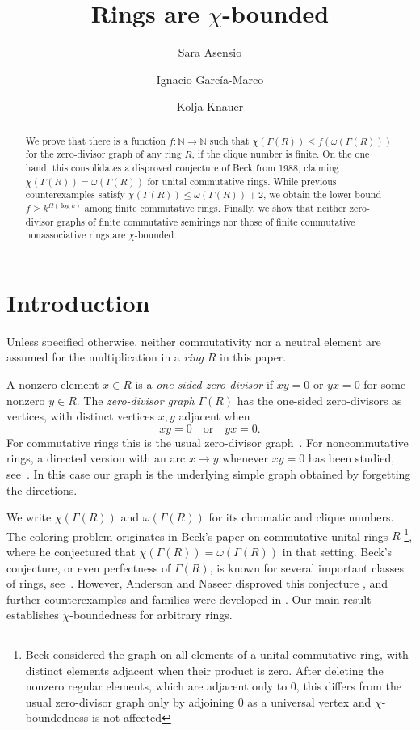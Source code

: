 \documentclass[a4paper,11pt]{amsart}
\title{Rings are $\chi$-bounded}
\author[S. Asensio]{Sara Asensio}
\author[I. García-Marco]{Ignacio García-Marco}
\author[K. Knauer]{Kolja Knauer}
\theoremstyle{definition}
\begin{document}
\maketitle

\begin{abstract}

We prove that there is a function $f:\mathbb N\to\mathbb N$ such that
$\chi(\Gamma(R))\le f(\omega(\Gamma(R)))$ 
for the zero-divisor graph of any ring $R$, if the clique number is
finite. 
On the one hand, this consolidates a disproved conjecture of Beck from 1988, claiming $\chi(\Gamma(R))=\omega(\Gamma(R))$ for unital commutative rings. While previous counterexamples satisfy  $\chi(\Gamma(R))\le \omega(\Gamma(R))+2$, we obtain the lower bound
$f\geq k^{\Omega(\log k)}$ among finite commutative rings. Finally, we show that neither zero-divisor graphs of finite commutative semirings nor those of finite commutative nonassociative rings are $\chi$-bounded.
\end{abstract}

\section{Introduction}\label{sec:introduction}


Unless specified otherwise, neither commutativity nor a neutral element are assumed for the multiplication in a \emph{ring} $R$ in this paper.
 
A nonzero element $x\in R$ is a \emph{one-sided zero-divisor} if $xy=0$ or $yx=0$
for some nonzero $y\in R$.  The \emph{zero-divisor graph} $\Gamma(R)$ has
the one-sided zero-divisors as vertices, with distinct vertices
$x,y$ adjacent when
\[
 xy=0\quad\text{or}\quad yx=0.
\]
For commutative rings this is the usual zero-divisor graph~\cite{AL99}. For noncommutative rings, a directed version with an arc $x\to y$ whenever $xy=0$ has been studied, see~\cite{Redmond02,Wu05,AM06}. In this case our graph is
the underlying simple graph obtained by forgetting the directions.

We write $\chi(\Gamma(R))$ and $\omega(\Gamma(R))$ for its chromatic and
clique numbers.  
The coloring problem originates in Beck's paper on commutative unital rings $R$
\cite{Beck88}\footnote{Beck considered the graph on all elements of a unital
commutative ring, with distinct elements adjacent when their product is zero.
After deleting the nonzero regular elements, which are adjacent only to $0$,
this differs from the usual zero-divisor graph only by adjoining $0$ as a
universal vertex and $\chi$-boundedness is not affected}, where he conjectured that $\chi(\Gamma(R))=\omega(\Gamma(R))$ in that setting. Beck's conjecture, or even perfectness of $\Gamma(R)$, is known for several important classes of rings, see~\cite{AAS11,PWJ17}. However, Anderson and Naseer disproved this conjecture \cite{AN93}, and
further counterexamples and families were developed in
\cite{AAS11,BDS98,DS98,Vietri13,Vietri15,TLW20,Kav22}. Our main result establishes $\chi$-boundedness for arbitrary rings. 
\end{document}
